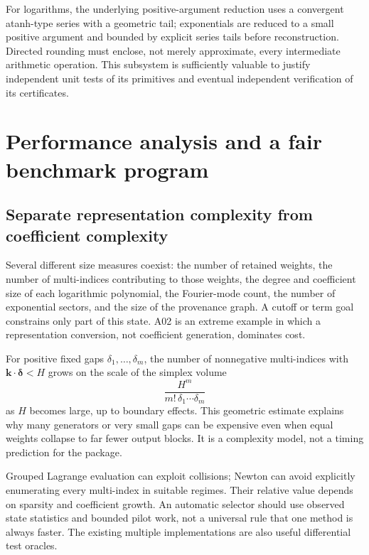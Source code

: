 \documentclass[11pt,letterpaper]{article}
\begin{document}
For logarithms, the underlying positive-argument reduction uses a convergent atanh-type series with a geometric tail; exponentials are reduced to a small positive argument and bounded by explicit series tails before reconstruction. Directed rounding must enclose, not merely approximate, every intermediate arithmetic operation. This subsystem is sufficiently valuable to justify independent unit tests of its primitives and eventual independent verification of its certificates.\cite{certificates}

\section{Performance analysis and a fair benchmark program}
\subsection{Separate representation complexity from coefficient complexity}
Several different size measures coexist: the number of retained weights, the number of multi-indices contributing to those weights, the degree and coefficient size of each logarithmic polynomial, the Fourier-mode count, the number of exponential sectors, and the size of the provenance graph. A cutoff or term goal constrains only part of this state. A02 is an extreme example in which a representation conversion, not coefficient generation, dominates cost.

For positive fixed gaps $\delta_1,\ldots,\delta_m$, the number of nonnegative multi-indices with $\mathbf{k}\cdot\boldsymbol\delta<H$ grows on the scale of the simplex volume
\begin{equation}
 \frac{H^m}{m!\,\delta_1\cdots\delta_m}
\end{equation}
as $H$ becomes large, up to boundary effects. This geometric estimate explains why many generators or very small gaps can be expensive even when equal weights collapse to far fewer output blocks. It is a complexity model, not a timing prediction for the package.

Grouped Lagrange evaluation can exploit collisions; Newton can avoid explicitly enumerating every multi-index in suitable regimes. Their relative value depends on sparsity and coefficient growth. An automatic selector should use observed state statistics and bounded pilot work, not a universal rule that one method is always faster. The existing multiple implementations are also useful differential test oracles.\cite{incremental}
\end{document}
